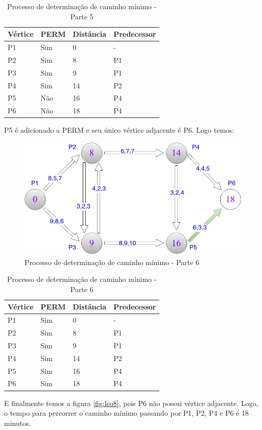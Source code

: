 \begin{table}[htbp]
  \centering
  \begin{tabular}{l l l l}
  \toprule
  Vértice & PERM & Distância & Predecessor\\
  \midrule
  P1 & Sim & 0 & - \\
  P2 & Sim & 8 & P1 \\
  P3 & Sim & 9 & P1 \\
  P4 & Sim & 14 & P2 \\
  P5 & Não & 16 & P4 \\
  P6 & Não & 18 & P4 \\
  \bottomrule
  \end{tabular}
\caption{Processo de determinação de caminho mínimo - Parte 5}
 \label{tab:leotab5}
\end{table}

P5 é adicionado a PERM e seu único vértice adjacente é P6. Logo temos:
\FloatBarrier
\begin{figure}[htbp]
\centering
 \includegraphics[width=.50\textwidth]{figuras/leo7.png}
\caption{Processo de determinação de caminho mínimo - Parte 6}
\label{fig:leo7}
\end{figure}

\begin{table}[htbp]
  \centering
  \begin{tabular}{l l l l}
  \toprule
  Vértice & PERM & Distância & Predecessor\\
  \midrule
  P1 & Sim & 0 & - \\
  P2 & Sim & 8 & P1 \\
  P3 & Sim & 9 & P1 \\
  P4 & Sim & 14 & P2 \\
  P5 & Sim & 16 & P4 \\
  P6 & Sim & 18 & P4 \\
  \bottomrule
  \end{tabular}
\caption{Processo de determinação de caminho mínimo - Parte 6}
 \label{tab:leotab5}
\end{table}
\FloatBarrier

E finalmente temos a figura \ref{fig:leo8}, pois P6 não possui vértice adjacente. Logo, o 
tempo para percorrer o caminho mínimo passando por P1, P2, P4 e P6 é 18 minutos.


